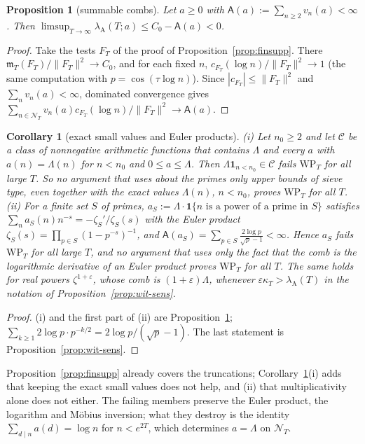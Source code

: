 \documentclass[11pt]{amsart}
\newtheorem{proposition}[theorem]{Proposition}
\newtheorem{corollary}[theorem]{Corollary}
\theoremstyle{definition}
\theoremstyle{remark}
\newcommand{\lamA}{\lambda_{\mathrm A}(T)}
\newcommand{\NT}{\mathcal N_T}
\newcommand{\mT}{\mathfrak m_T}
\begin{document}
\begin{proposition}[summable combs]\label{prop:summable}
Let $a\ge0$ with $\mathsf A(a):=\sum_{n\ge2}v_n(a)<\infty$. Then $\limsup_{T\to\infty}\lambda_{\mathrm A}(T;a)\le C_0-\mathsf A(a)<0$.
\end{proposition}

\begin{proof}
Take the tests $F_T$ of the proof of Proposition~\ref{prop:finsupp}. There $\mT(F_T)/\|F_T\|^2\to C_0$, and for each fixed $n$,
$c_{F_T}(\log n)/\|F_T\|^2\to1$ (the same computation with $p=\cos(\tau\log n)$). Since $|c_{F_T}|\le\|F_T\|^2$ and
$\sum_nv_n(a)<\infty$, dominated convergence gives $\sum_{n\in\NT}v_n(a)c_{F_T}(\log n)/\|F_T\|^2\to\mathsf A(a)$.
\end{proof}

\begin{corollary}[exact small values and Euler products]\label{cor:wtail}
\emph{(i)} Let $n_0\ge2$ and let $\mathcal C$ be a class of nonnegative arithmetic functions that contains $\Lambda$ and every $a$ with
$a(n)=\Lambda(n)$ for $n<n_0$ and $0\le a\le\Lambda$. Then $\Lambda\mathbf 1_{n<n_0}\in\mathcal C$ fails $\mathrm{WP}_T$ for all large $T$.
So no argument that uses about the primes only upper bounds of sieve type, even together with the exact values
$\Lambda(n)$, $n<n_0$, proves $\mathrm{WP}_T$ for all $T$.
\emph{(ii)} For a finite set $S$ of primes, $a_S:=\Lambda\cdot\mathbf 1\{n\text{ is a power of a prime in }S\}$ satisfies
$\sum_na_S(n)n^{-s}=-\zeta_S'/\zeta_S(s)$ with the Euler product $\zeta_S(s)=\prod_{p\in S}(1-p^{-s})^{-1}$, and
$\mathsf A(a_S)=\sum_{p\in S}\frac{2\log p}{\sqrt p-1}<\infty$. Hence $a_S$ fails $\mathrm{WP}_T$ for all large $T$, and no argument
that uses only the fact that the comb is the logarithmic derivative of an Euler product proves $\mathrm{WP}_T$ for all $T$.
The same holds for real powers $\zeta^{1+\varepsilon}$, whose comb is $(1+\varepsilon)\Lambda$, whenever $\varepsilon\kappa_T>\lamA$ in the
notation of Proposition~\ref{prop:wit-sens}.
\end{corollary}

\begin{proof}
(i) and the first part of (ii) are Proposition~\ref{prop:summable}; $\sum_{k\ge1}2\log p\cdot p^{-k/2}=2\log p/(\sqrt p-1)$. The last
statement is Proposition~\ref{prop:wit-sens}.
\end{proof}

Proposition~\ref{prop:finsupp} already covers the truncations; Corollary~\ref{cor:wtail}(i) adds that keeping the exact small
values does not help, and (ii) that multiplicativity alone does not either. The failing members preserve the Euler product,
the logarithm and M\"obius inversion; what they destroy is the identity $\sum_{d\mid n}a(d)=\log n$ for $n<e^{2T}$, which
determines $a=\Lambda$ on $\NT$.
\end{document}
